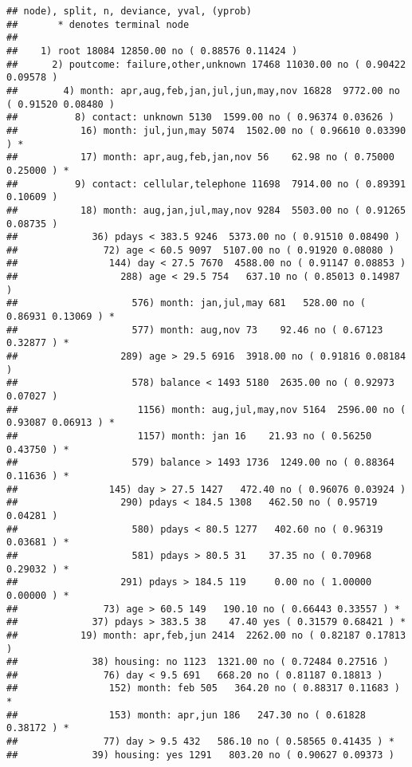 \documentclass[
]{article}
\begin{document}
\begin{verbatim}
## node), split, n, deviance, yval, (yprob)
##       * denotes terminal node
## 
##    1) root 18084 12850.00 no ( 0.88576 0.11424 )  
##      2) poutcome: failure,other,unknown 17468 11030.00 no ( 0.90422 0.09578 )  
##        4) month: apr,aug,feb,jan,jul,jun,may,nov 16828  9772.00 no ( 0.91520 0.08480 )  
##          8) contact: unknown 5130  1599.00 no ( 0.96374 0.03626 )  
##           16) month: jul,jun,may 5074  1502.00 no ( 0.96610 0.03390 ) *
##           17) month: apr,aug,feb,jan,nov 56    62.98 no ( 0.75000 0.25000 ) *
##          9) contact: cellular,telephone 11698  7914.00 no ( 0.89391 0.10609 )  
##           18) month: aug,jan,jul,may,nov 9284  5503.00 no ( 0.91265 0.08735 )  
##             36) pdays < 383.5 9246  5373.00 no ( 0.91510 0.08490 )  
##               72) age < 60.5 9097  5107.00 no ( 0.91920 0.08080 )  
##                144) day < 27.5 7670  4588.00 no ( 0.91147 0.08853 )  
##                  288) age < 29.5 754   637.10 no ( 0.85013 0.14987 )  
##                    576) month: jan,jul,may 681   528.00 no ( 0.86931 0.13069 ) *
##                    577) month: aug,nov 73    92.46 no ( 0.67123 0.32877 ) *
##                  289) age > 29.5 6916  3918.00 no ( 0.91816 0.08184 )  
##                    578) balance < 1493 5180  2635.00 no ( 0.92973 0.07027 )  
##                     1156) month: aug,jul,may,nov 5164  2596.00 no ( 0.93087 0.06913 ) *
##                     1157) month: jan 16    21.93 no ( 0.56250 0.43750 ) *
##                    579) balance > 1493 1736  1249.00 no ( 0.88364 0.11636 ) *
##                145) day > 27.5 1427   472.40 no ( 0.96076 0.03924 )  
##                  290) pdays < 184.5 1308   462.50 no ( 0.95719 0.04281 )  
##                    580) pdays < 80.5 1277   402.60 no ( 0.96319 0.03681 ) *
##                    581) pdays > 80.5 31    37.35 no ( 0.70968 0.29032 ) *
##                  291) pdays > 184.5 119     0.00 no ( 1.00000 0.00000 ) *
##               73) age > 60.5 149   190.10 no ( 0.66443 0.33557 ) *
##             37) pdays > 383.5 38    47.40 yes ( 0.31579 0.68421 ) *
##           19) month: apr,feb,jun 2414  2262.00 no ( 0.82187 0.17813 )  
##             38) housing: no 1123  1321.00 no ( 0.72484 0.27516 )  
##               76) day < 9.5 691   668.20 no ( 0.81187 0.18813 )  
##                152) month: feb 505   364.20 no ( 0.88317 0.11683 ) *
##                153) month: apr,jun 186   247.30 no ( 0.61828 0.38172 ) *
##               77) day > 9.5 432   586.10 no ( 0.58565 0.41435 ) *
##             39) housing: yes 1291   803.20 no ( 0.90627 0.09373 )  

\end{verbatim}
\end{document}
